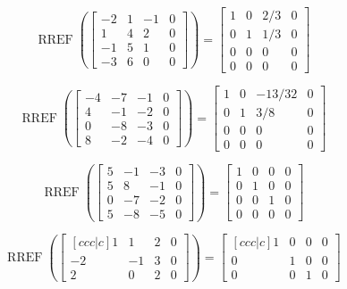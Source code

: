 \documentclass{article}
\DeclareMathOperator{\RREF}{RREF}
\begin{document}
\[
  \RREF \left( \begin{bmatrix}
    -2 & 1 & -1 & 0 \\
    1 & 4 & 2 & 0 \\
    -1 & 5 & 1 & 0 \\
    -3 & 6 & 0 & 0
  \end{bmatrix} \right) = \begin{bmatrix}
    1 & 0 & 2/3 & 0 \\
    0 & 1 & 1/3 & 0 \\
    0 & 0 & 0 & 0 \\
    0 & 0 & 0 & 0
  \end{bmatrix}
\]

\[
  \RREF \left( \begin{bmatrix}
    -4 & -7 & -1 & 0 \\
    4 & -1 & -2 & 0 \\
    0 & -8 & -3 & 0 \\
    8 & -2 & -4 & 0
  \end{bmatrix} \right) = \begin{bmatrix}
    1 & 0 & -13/32 & 0 \\
    0 & 1 & 3/8 & 0 \\
    0 & 0 & 0 & 0 \\
    0 & 0 & 0 & 0
  \end{bmatrix}
\]

\[
  \RREF \left( \begin{bmatrix}
    5 & -1 & -3 & 0 \\
    5 & 8 & -1 & 0 \\
    0 & -7 & -2 & 0 \\
    5 & -8 & -5 & 0
  \end{bmatrix} \right) = \begin{bmatrix}
    1 & 0 & 0 & 0 \\
    0 & 1 & 0 & 0 \\
    0 & 0 & 1 & 0 \\
    0 & 0 & 0 & 0
  \end{bmatrix}
\]


\[\RREF\left( \begin{bmatrix}[ccc|c]

1 & 1& 2 &0 \\ 
-2 &-1 &3 &0\\ 
2 & 0 &2 &0
\end{bmatrix} \right) 
= \begin{bmatrix}[ccc|c]
1 & 0 &0 &0 \\ 0& 1& 0  & 0 \\ 0 &0 & 1 &0
\end{bmatrix}\]
\end{document}
